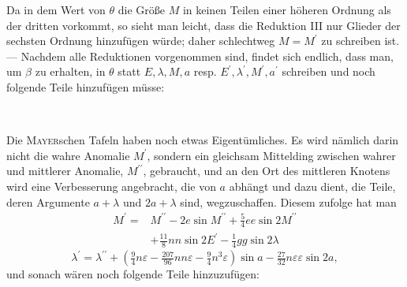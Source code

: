\clearpage
\begingroup
{}
\renewcommand{\headrulewidth}{0pt}
\par\noindent\hspace*{\parindent}Da in dem Wert von \(\theta\) die Größe \(M\) in keinen Teilen einer höheren
Ordnung als der dritten vorkommt, so sieht man leicht, dass die Reduktion
III nur Glieder der sechsten Ordnung hinzufügen würde; daher schlechtweg
\(M=M^{\prime}\) zu schreiben ist. — Nachdem alle Reduktionen vorgenommen sind,
findet sich endlich, dass man, um \(\beta\) zu erhalten, in \(\theta\) statt \(E,\lambda,M,a\) resp.
\(E^{\prime},\lambda^{\prime},M^{\prime},a^{\prime}\) schreiben und noch folgende Teile hinzufügen müsse:
\begin{center}
\\[4pt]
\end{center}
\par\noindent\hspace*{\parindent}Die \textsc{Mayer}schen Tafeln haben noch etwas Eigentümliches. Es wird
nämlich darin nicht die wahre Anomalie \(M^{\prime}\), sondern ein gleichsam Mittelding
zwischen wahrer und mittlerer Anomalie, \(M^{\prime\prime}\), gebraucht, und an den
Ort des mittleren Knotens wird eine Verbesserung angebracht, die von \(a\) abhängt
und dazu dient, die Teile, deren Argumente \(a+\lambda\) und \(2a+\lambda\) sind,
wegzuschaffen. Diesem zufolge hat man
\[
\begin{aligned}
M^{\prime}={}&M^{\prime\prime}-2e\sin M^{\prime\prime}
 +\tfrac54ee\sin2M^{\prime\prime}\\
&+\tfrac{11}{8}nn\sin2E^{\prime}-\tfrac14gg\sin2\lambda
\end{aligned}
\]
\[
\lambda^{\prime}=\lambda^{\prime\prime}
 +\left(\tfrac94n\varepsilon-\tfrac{207}{96}nn\varepsilon
 -\tfrac94n^3\varepsilon\right)\sin a
 -\tfrac{27}{32}n\varepsilon\varepsilon\sin2a,
\]
\noindent und sonach wären noch folgende Teile hinzuzufügen:
\begin{center}
\\[4pt]
\end{center}
